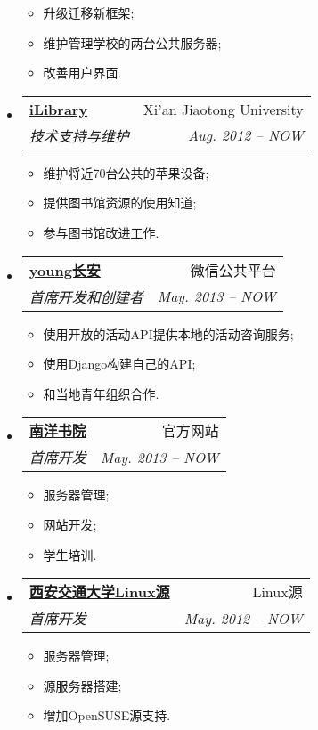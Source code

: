 \documentclass[letterpaper,11pt]{article}
\makeatletter
\newcommand{\resitem}[1]{\item #1 \vspace{-2pt}}
\newcommand{\ressubheading}[4]{
\begin{tabular*}{6.5in}{l@{\extracolsep{\fill}}r}
		\textbf{#1} & #2 \\
		\textit{#3} & \textit{#4} \\
\end{tabular*}\vspace{-6pt}}
\makeatother
\begin{document}
\begin{CJK}{UTF8}{gbsn}
\begin{itemize}
				{ \footnotesize
				\begin{itemize}
					\resitem{升级迁移新框架;}
					\resitem{维护管理学校的两台公共服务器;}
					\resitem{改善用户界面.}
				\end{itemize}
				}
		\item 
			\ressubheading{\href{http://www.lib.xjtu.edu.cn/}{iLibrary}}{Xi'an Jiaotong University}{技术支持与维护}{Aug. 2012 -- NOW}
				{ \footnotesize
				\begin{itemize}
					\resitem{维护将近70台公共的苹果设备;}
					\resitem{提供图书馆资源的使用知道;}
					\resitem{参与图书馆改进工作.}
				\end{itemize}
				}
		\item 
			\ressubheading{\href{http://nanyang.xjtu.edu.cn/WeChat/note.html}{young长安}}{微信公共平台}{首席开发和创建者}{May. 2013 -- NOW}
				{ \footnotesize
				\begin{itemize}
					\resitem{使用开放的活动API提供本地的活动咨询服务;}
					\resitem{使用Django构建自己的API;}
					\resitem{和当地青年组织合作.}
				\end{itemize}
				}
\item 
			\ressubheading{\href{http://nanyang.xjtu.edu.cn/}{南洋书院}}{官方网站}{首席开发}{May. 2013 -- NOW}
				{ \footnotesize
				\begin{itemize}
					\resitem{服务器管理;}
					\resitem{网站开发;}
					\resitem{学生培训.}
				\end{itemize}
				}
\item 
			\ressubheading{\href{http://nanyang.xjtu.edu.cn/}{西安交通大学Linux源}}{Linux源}{首席开发}{May. 2012 -- NOW}
				{ \footnotesize
				\begin{itemize}
					\resitem{服务器管理;}
					\resitem{源服务器搭建;}
					\resitem{增加OpenSUSE源支持.}
				\end{itemize}
				}
	\end{itemize}	
	

\end{CJK}
\end{document}
